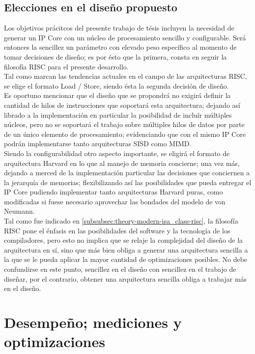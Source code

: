 \subsection{Elecciones en el diseño propuesto}

Los objetivos prácitcos del presente trabajo de tésis incluyen la necesidad de 
generar un IP Core con un núcleo de procesamiento sencillo y configurable. 
Será entonces la sencillez un parámetro con elevado peso específico 
al momento de tomar decisiones de diseño; es por ésto que la primera, consta en 
seguir la filosofía RISC para el presente desarrollo.\\
Tal como marcan las tendencias actuales en el campo de las arquitecturas RISC, 
se elige el formato Load / Store, siendo ésta la segunda decisión de 
diseño.\\
Es oportuno mencionar que el diseño que se propondrá no exigirá definir la 
cantidad de hilos de instrucciones que soportará esta arquitectura; dejando así 
librado a la implementación en particular la posibilidad de incluír múltiples 
núcleos, pero no se soportará el trabajo sobre múltiples hilos de datos por 
parte de un único elemento de procesamiento; evidenciando que con el mismo IP 
Core podrán implementarse tanto arquitecturas SISD como MIMD.\\
Siendo la configurabilidad otro aspecto importante, se eligirá el formato de 
arquitectura Harvard en lo que al manejo de memoria concierne; una vez más, 
dejando a merced de la implementación particular las decisiones que conciernen a 
la jerarquía de memorias; flexibilizando así las posibilidades que pueda 
entregar el IP Core pudiendo implementar tanto arquitecturas Harvard puras, 
como modificadas si fuese necesario aprovechar las bondades del modelo de von 
Neumann.\\
Tal como fue indicado en \ref{subsubsec:theory-modern-isa_class-risc}, la 
filosofía RISC pone el énfasis en las posibilidades del software y la 
tecnología de los compiladores, pero esto no implica que se relaje la 
complejidad del diseño de la arquitectura en sí, sino que más bien obliga a 
generar una arquitectura sencilla a la que se le pueda aplicar la mayor 
cantidad de optimizaciones posibles. No debe confundirse en este punto, 
sencillez en el diseño con sencillez en el trabajo de diseñar, por el 
contrario, obtener una arquitectura sencilla obliga a trabajar más en el diseño.

\section{Desempeño; mediciones y optimizaciones}
\label{sec:performance}

